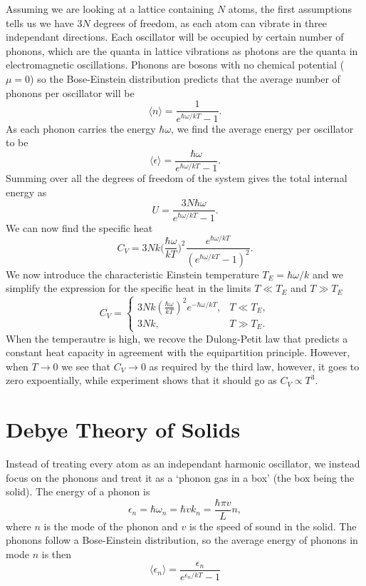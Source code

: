 \documentclass[a4paper, 11pt, notitlepage, english]{article}
\newcommand{\eps}{\epsilon}
\begin{document}
Assuming we are looking at a lattice containing $N$ atoms, the first assumptions tells us we have $3N$ degrees of freedom, as each atom can vibrate in three independant directions. Each oscillator will be occupied by certain number of phonons, which are the quanta in lattice vibrations as photons are the quanta in electromagnetic oscillations. Phonons are bosons with no chemical potential ($\mu = 0$) so the Bose-Einstein distribution predicts that the average number of phonons per oscillator will be
$$\langle n \rangle = \frac{1}{e^{\hbar \omega/kT} - 1}.$$
As each phonon carries the energy $\hbar \omega$, we find the average energy per oscillator to be
$$\langle \eps \rangle = \frac{\hbar \omega}{e^{\hbar \omega/kT} - 1}.$$
Summing over all the degrees of freedom of the system gives the total internal energy as
$$U = \frac{3N\hbar \omega}{e^{\hbar \omega/kT} - 1}.$$
We can now find the specific heat
$$C_V = 3Nk \bigg(\frac{\hbar \omega}{kT}\bigg)^2 \frac{e^{\hbar \omega/kT}}{(e^{\hbar \omega/kT}-1)^2}.$$
We now introduce the characteristic Einstein temperature $T_E = \hbar \omega/k$ and we simplify the expression for the specific heat in the limits $T \ll T_E$ and $T \gg T_E$
$$C_V = \begin{cases}
	3Nk (\frac{\hbar\omega}{kT})^2 e^{-\hbar\omega/kT}, & T \ll T_E, \\
	3Nk, & T \gg T_E.
\end{cases}$$
When the temperautre is high, we recove the Dulong-Petit law that predicts a constant heat capacity in agreement with the equipartition principle. However, when $T\to 0$ we see that $C_V \to 0$ as required by the third law, however, it goes to zero expoentially, while experiment shows that it should go as $C_V \propto T^3$.

\clearpage

\section*{Debye Theory of Solids}

Instead of treating every atom as an independant harmonic oscillator, we instead focus on the phonons and treat it as a `phonon gas in a box' (the box being the solid).  The energy of a phonon is 
$$\eps_n = \hbar \omega_n = \hbar v k_n = \frac{\hbar \pi v}{L}n,$$
where $n$ is the mode of the phonon and $v$ is the speed of sound in the solid. The phonons follow a Bose-Einstein distribution, so the average energy of phonons in mode $n$ is then 
$$\langle \eps_n \rangle = \frac{\eps_n}{e^{\eps_n/kT} - 1}$$
\end{document}
